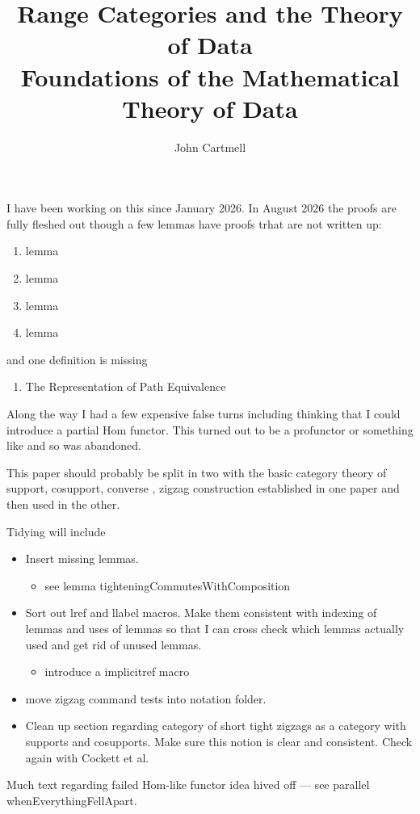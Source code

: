 \documentclass[10pt,a4paper]{article}
\theoremstyle{remark}
\begin{document}
\title{Range Categories and the Theory of Data\\[0.5em]
\large Foundations of the Mathematical Theory of Data}

\author{John Cartmell}
\date{}
\maketitle
\begin{aside}
I have been working on this since January 2026.
In August 2026 the proofs are fully fleshed out though a few lemmas have proofs trhat are not written up:
\begin{enumerate}
  \item lemma   
  \item lemma   
  \item lemma  
  \item lemma  
\end{enumerate}
and one definition is missing
\begin{enumerate}
  \item The Representation of Path Equivalence
\end{enumerate}

Along the way I had a few expensive false turns including thinking that I could introduce a partial Hom functor. 
This turned out to be a profunctor or something like and so was abandoned.

This paper should probably be split in two with the basic category theory 
of support, cosupport, converse , zigzag construction established in one paper and then used in the other.

Tidying will include
\begin{itemize}
\item Insert missing lemmas.
\begin{itemize}
  \item see lemma tighteningCommutesWithComposition
\end{itemize}
\item Sort out lref and llabel macros. Make them consistent with
indexing of lemmas and uses of lemmas so that I can cross check which lemmas actually used and get rid of unused lemmas.
\begin{itemize}
  \item introduce a implicitref macro
\end{itemize}
\item move zigzag command tests into notation folder.
\item Clean up section regarding category of short tight zigzags as a category with supports and cosupports. Make sure this notion is clear and consistent. Check again with Cockett et al.
\end{itemize}
\end{aside}
\begin{aside}
Much text regarding failed Hom-like functor idea hived off --- see
parallel whenEverythingFellApart.
\end{aside}
\end{document}
